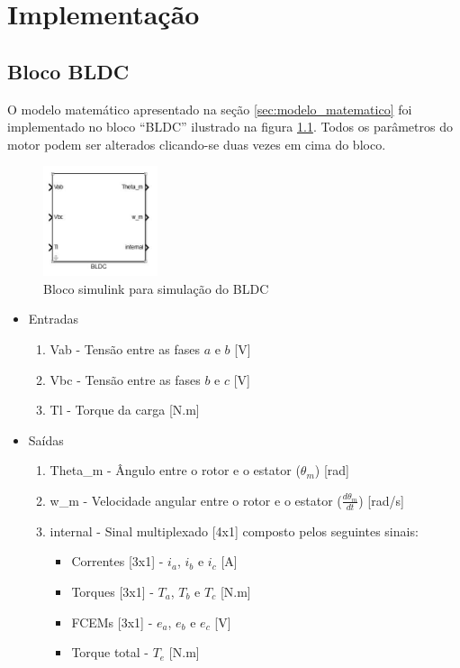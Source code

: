 \chapter{Implementação}

    \section{Bloco BLDC}
        O modelo matemático apresentado na seção \ref{sec:modelo_matematico} foi implementado no bloco ``BLDC'' ilustrado na figura \ref{fig:bloco_BLDC}. Todos os parâmetros do motor podem ser alterados clicando-se duas vezes em cima do bloco.
        \begin{figure}[ht]
            \centering
            \includegraphics[width=0.3\textwidth]{bloco_BLDC}
            \caption{Bloco simulink para simulação do BLDC}
            \label{fig:bloco_BLDC}
        \end{figure}

        \begin{itemize}
            \item Entradas
            \begin{enumerate}
                \item Vab - Tensão entre as fases $a$ e $b$ [V]
                \item Vbc - Tensão entre as fases $b$ e $c$ [V]
                \item Tl - Torque da carga [N.m]
            \end{enumerate}
            \item Saídas
            \begin{enumerate}
                \item Theta\_m - Ângulo entre o rotor e o estator ($\theta_m$) [rad]
                \item w\_m - Velocidade angular entre o rotor e o estator ($\frac{d\theta_m}{dt}$) [rad/s]
                \item internal - Sinal multiplexado [4x1] composto pelos seguintes sinais:
                \begin{itemize}
                    \item Correntes [3x1] - $i_a$, $i_b$ e $i_c$ [A]
                    \item Torques [3x1] - $T_a$, $T_b$ e $T_c$ [N.m]
                    \item FCEMs [3x1] - $e_a$, $e_b$ e $e_c$ [V]
                    \item Torque total - $T_e$ [N.m]
                \end{itemize}
            \end{enumerate}
        \end{itemize}


